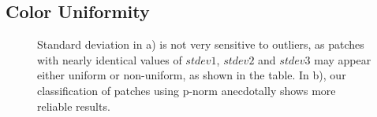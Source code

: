 \subsection{Color Uniformity}

\begin{figure}[ht!]
\caption{Standard deviation in a) is not very sensitive
to outliers, as patches with nearly identical
values of $stdev1$, $stdev2$ and $stdev3$ may appear
either uniform or non-uniform, as shown in the table.
In b), our classification of patches using
p-norm anecdotally shows more reliable results.}
\end{figure}
